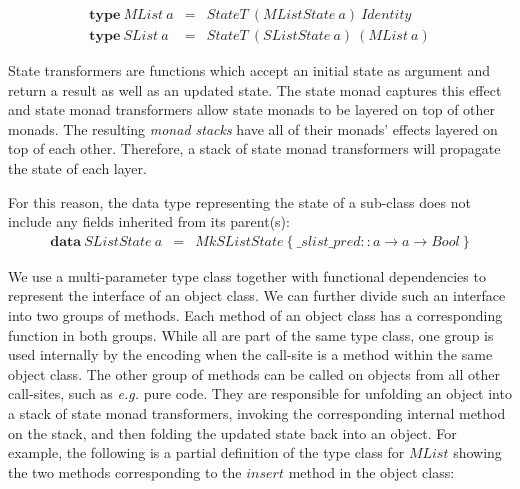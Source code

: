 \documentclass[runningheads,a4paper]{llncs}
\newcommand{\todo}[1]{[{\color{blue}#1}]}
\begin{document}
\begin{displaymath}
\begin{array}{lcl}
\mathbf{type}~\mathit{MList}~a & = & \mathit{StateT}~(\mathit{MListState}~a)~\mathit{Identity} \\
\mathbf{type}~\mathit{SList}~a & = & \mathit{StateT}~(\mathit{SListState}~a)~(\mathit{MList}~a)
\end{array}
\end{displaymath}

State transformers are functions which accept an initial state as argument and return a result as well as an updated state. The state monad captures this effect and state monad transformers allow state monads to be layered on top of other monads. The resulting \emph{monad stacks} have all of their monads' effects layered on top of each other. Therefore, a stack of state monad transformers will propagate the state of each layer.

For this reason, the data type representing the state of a sub-class does not include any fields inherited from its parent(s):
\begin{displaymath}
\begin{array}{lcl}
\mathbf{data}~\mathit{SListState}~a & = & \mathit{MkSListState}~\{~ \_ slist \_ pred :: a \to a \to \mathit{Bool}~\}
\end{array}
\end{displaymath}

We use a multi-parameter type class together with functional dependencies \cite{jones2000type} to represent the interface of an object class. We can further divide such an interface into two groups of methods. Each method of an object class has a corresponding function in both groups. While all are part of the same type class, one group is used internally by the encoding when the call-site is a method within the same object class. The other group of methods can be called on objects from all other call-sites, such as \emph{e.g.} pure code. They are responsible for unfolding an object into a stack of state monad transformers, invoking the corresponding internal method on the stack, and then folding the updated state back into an object. For example, the following is a partial definition of the type class for $\mathit{MList}$ showing the two methods corresponding to the $\mathit{insert}$ method in the object class:
 
\end{document}
